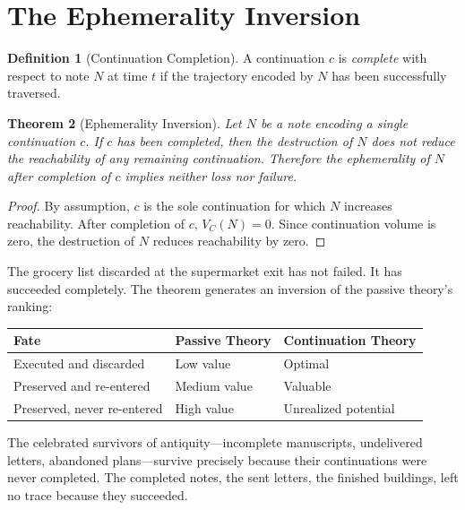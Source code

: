 \documentclass[12pt, a4paper, openany]{book}
\theoremstyle{plain}
\newtheorem{theorem}{Theorem}[chapter]
\theoremstyle{definition}
\newtheorem{definition}[theorem]{Definition}
\theoremstyle{remark}
\begin{document}
\section{The Ephemerality Inversion}

\begin{definition}[Continuation Completion]
A continuation $c$ is \emph{complete} with respect to note $N$ at time $t$ if
the trajectory encoded by $N$ has been successfully traversed.
\end{definition}

\begin{theorem}[Ephemerality Inversion]
Let $N$ be a note encoding a single continuation $c$. If $c$ has been completed,
then the destruction of $N$ does not reduce the reachability of any remaining
continuation. Therefore the ephemerality of $N$ after completion of $c$ implies
neither loss nor failure.
\end{theorem}

\begin{proof}
By assumption, $c$ is the sole continuation for which $N$ increases reachability.
After completion of $c$, $V_C(N) = 0$. Since continuation volume is zero, the
destruction of $N$ reduces reachability by zero.
\end{proof}

The grocery list discarded at the supermarket exit has not failed. It has succeeded
completely. The theorem generates an inversion of the passive theory's ranking:

\begin{center}
\begin{tabular}{lll}
\toprule
Fate & Passive Theory & Continuation Theory \\
\midrule
Executed and discarded & Low value & Optimal \\
Preserved and re-entered & Medium value & Valuable \\
Preserved, never re-entered & High value & Unrealized potential \\
\bottomrule
\end{tabular}
\end{center}

The celebrated survivors of antiquity---incomplete manuscripts, undelivered
letters, abandoned plans---survive precisely because their continuations were never
completed. The completed notes, the sent letters, the finished buildings, left no
trace because they succeeded.

\end{document}
